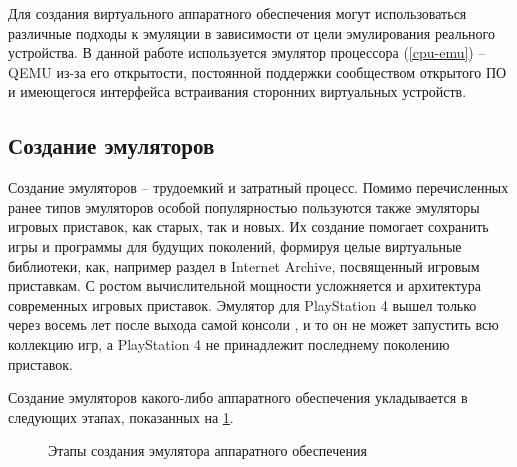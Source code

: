 Для создания виртуального аппаратного обеспечения могут использоваться различные подходы к эмуляции в зависимости
от цели эмулирования реального устройства.
В данной работе используется эмулятор процессора (\cref{cpu-emu}) -- QEMU \cite{qemu} из-за его открытости,
постоянной поддержки сообществом открытого ПО и имеющегося интерфейса встраивания
сторонних виртуальных устройств.


\subsection*{Создание эмуляторов}\label{sec:ch1/sec1/sub2}

Создание эмуляторов -- трудоемкий и затратный процесс. Помимо перечисленных ранее типов эмуляторов особой популярностью
пользуются также эмуляторы игровых приставок, как старых, так и новых.
Их создание помогает сохранить игры и программы для будущих поколений, формируя целые виртуальные библиотеки, как,
например раздел в Internet Archive\cite{console-archive}, посвященный игровым приставкам.
С ростом вычислительной мощности усложняется и архитектура современных игровых приставок.
Эмулятор для PlayStation 4 вышел только через восемь лет после выхода самой консоли \cite{ps4-emulator}, и то
он не может запустить всю коллекцию игр, а PlayStation 4 не принадлежит последнему поколению приставок.

Создание эмуляторов какого-либо аппаратного обеспечения укладывается в следующих этапах,
показанных на \cref{fig:emu-creation-naive}.

\begin{figure}[!htbp]
    \centering
    \caption{Этапы создания эмулятора аппаратного обеспечения}\label{fig:emu-creation-naive}
\end{figure}

